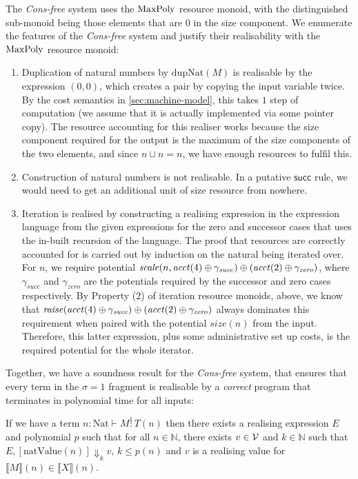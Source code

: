 \documentclass[acmsmall,screen]{acmart}
\newcommand{\tyNat}{\mathrm{Nat}}
\newcommand{\conSucc}{\mathsf{succ}}
\newcommand{\dupNat}{\mathrm{dupNat}}
\begin{document}
The \emph{Cons-free} system uses the $\mathrm{MaxPoly}$ resource monoid, with
the distinguished sub-monoid being those elements that are $0$ in the
size component. We enumerate the features of the \emph{Cons-free}
system and justify their realisability with the $\mathrm{MaxPoly}$ resource
monoid:
\begin{enumerate}
\item Duplication of natural numbers by $\dupNat(M)$ is realisable by
  the expression $(0,0)$, which creates a pair by copying the input
  variable twice. By the cost semantics in
  \autoref{sec:machine-model}, this takes $1$ step of computation (we
  assume that it is actually implemented via some pointer copy).  The
  resource accounting for this realiser works because the size
  component required for the output is the maximum of the size
  components of the two elements, and since $n \sqcup n = n$, we have
  enough resources to fulfil this.
\item Construction of natural numbers is not realisable. In a putative
  $\conSucc$ rule, we would need to get an additional unit of size
  resource from nowhere.
\item Iteration is realised by constructing a realising expression in
  the expression language from the given expressions for the zero and
  successor cases that uses the in-built recursion of the
  language. The proof that resources are correctly accounted for is
  carried out by induction on the natural being iterated over. For
  $n$, we require potential
  $\mathit{scale}(n,\mathit{acct}(4) \oplus \gamma_{\mathit{succ}})
  \oplus (\mathit{acct}(2) \oplus \gamma_{\mathit{zero}})$, where
  $\gamma_{\mathit{succ}}$ and $\gamma_{\mathit{zero}}$ are the
  potentials required by the successor and zero cases respectively. By
  Property (2) of iteration resource monoids, above, we know that
  $\mathit{raise}(\mathit{acct}(4) \oplus \gamma_{\mathit{succ}})
  \oplus (\mathit{acct}(2) \oplus \gamma_{\mathit{zero}})$ always
  dominates this requirement when paired with the potential
  $\mathit{size}(n)$ from the input. Therefore, this latter
  expression, plus some administrative set up costs, is the required
  potential for the whole iterator.
\end{enumerate}
Together, we have a soundness result for the \emph{Cons-free} system,
that ensures that every term in the $\sigma = 1$ fragment is
realisable by a \emph{correct} program that terminates in polynomial
time for all inputs:
\begin{theorem}
  \label{thm:cons-free-soundness}
  If we have a term $n : \tyNat \vdash M \stackrel1: T(n)$ then there
  exists a realising expression $E$ and polynomial $p$ such that for
  all $n \in \mathbb{N}$, there exists $v \in \mathcal{V}$ and
  $k \in \mathbb{N}$ such that
  $E, [\mathrm{natValue}(n)] \Downarrow_k v$, $k \leq p(n)$ and $v$ is
  a realising value for
  $\llbracket M \rrbracket(n) \in \llbracket X \rrbracket(n)$.
\end{theorem}
\end{document}
